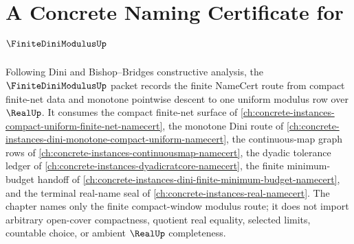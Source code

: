 \chapter{A Concrete Naming Certificate for $\FiniteDiniModulusUp$}
\label{ch:concrete-instances-finite-dini-modulus-namecert}

Following Dini and Bishop--Bridges constructive analysis, the $\FiniteDiniModulusUp$ packet records the finite NameCert route from compact finite-net data and monotone pointwise descent to one uniform modulus row over $\RealUp$. It consumes the compact finite-net surface of \autoref{ch:concrete-instances-compact-uniform-finite-net-namecert}, the monotone Dini route of \autoref{ch:concrete-instances-dini-monotone-compact-uniform-namecert}, the continuous-map graph rows of \autoref{ch:concrete-instances-continuousmap-namecert}, the dyadic tolerance ledger of \autoref{ch:concrete-instances-dyadicratcore-namecert}, the finite minimum-budget handoff of \autoref{ch:concrete-instances-dini-finite-minimum-budget-namecert}, and the terminal real-name seal of \autoref{ch:concrete-instances-real-namecert}. The chapter names only the finite compact-window modulus route; it does not import arbitrary open-cover compactness, quotient real equality, selected limits, countable choice, or ambient $\RealUp$ completeness.

